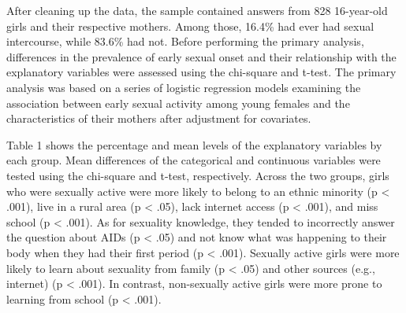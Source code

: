 \documentclass[
]{article}
\begin{document}
After cleaning up the data, the sample contained answers from 828
16-year-old girls and their respective mothers. Among those, 16.4\% had
ever had sexual intercourse, while 83.6\% had not. Before performing the
primary analysis, differences in the prevalence of early sexual onset
and their relationship with the explanatory variables were assessed
using the chi-square and t-test. The primary analysis was based on a
series of logistic regression models examining the association between
early sexual activity among young females and the characteristics of
their mothers after adjustment for covariates.

Table 1 shows the percentage and mean levels of the explanatory
variables by each group. Mean differences of the categorical and
continuous variables were tested using the chi-square and t-test,
respectively. Across the two groups, girls who were sexually active were
more likely to belong to an ethnic minority (p \textless{} .001), live
in a rural area (p \textless{} .05), lack internet access (p \textless{}
.001), and miss school (p \textless{} .001). As for sexuality knowledge,
they tended to incorrectly answer the question about AIDs (p \textless{}
.05) and not know what was happening to their body when they had their
first period (p \textless{} .001). Sexually active girls were more
likely to learn about sexuality from family (p \textless{} .05) and
other sources (e.g., internet) (p \textless{} .001). In contrast,
non-sexually active girls were more prone to learning from school (p
\textless{} .001).
\end{document}
